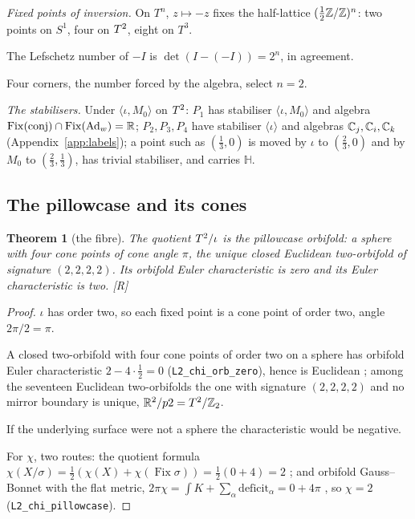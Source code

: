 \documentclass[11pt,a4paper]{article}
\theoremstyle{plain}
\newtheorem{theorem}{Theorem}[section]
\theoremstyle{definition}
\theoremstyle{remark}
\newcommand{\Hquat}{\mathbb{H}}
\newcommand{\Ad}{\operatorname{Ad}}
\newcommand{\Fix}{\operatorname{Fix}}
\newcommand{\rigR}{[\textup{R}]}
\begin{document}
\emph{Fixed points of inversion.} On $T^{n}$, $z\mapsto-z$ fixes the half-lattice $(\tfrac12\mathbb{Z}/\mathbb{Z})^{n}$: two points on $S^{1}$, four on $T^2$, eight on $T^{3}$.

The Lefschetz number of $-I$ is $\det(I-(-I))=2^{n}$, in agreement.

Four corners, the number forced by the algebra, select $n=2$.

\emph{The stabilisers.} Under $\langle\iota,M_{0}\rangle$ on $T^2$: $P_{1}$ has stabiliser $\langle\iota,M_{0}\rangle$ and algebra $\Fix(\text{conj})\cap\Fix(\Ad_{w})=\R$; $P_{2},P_{3},P_{4}$ have stabiliser $\langle\iota\rangle$ and algebras $\mathbb{C}_{j},\mathbb{C}_{i},\mathbb{C}_{k}$ (Appendix~\ref{app:labels}); a point such as $(\tfrac13,0)$ is moved by $\iota$ to $(\tfrac23,0)$ and by $M_{0}$ to $(\tfrac23,\tfrac13)$, has trivial stabiliser, and carries $\Hquat$.

\subsection{The pillowcase and its cones}

\begin{theorem}[the fibre]\label{thm:fibre}
The quotient $T^2/\iota$ is the pillowcase orbifold: a sphere with four cone points of cone angle $\pi$, the unique closed Euclidean two-orbifold of signature $(2,2,2,2)$. Its orbifold Euler characteristic is zero and its Euler characteristic is two. \rigR
\end{theorem}

\begin{proof}
$\iota$ has order two, so each fixed point is a cone point of order two, angle $2\pi/2=\pi$.

A closed two-orbifold with four cone points of order two on a sphere has orbifold Euler characteristic $2-4\cdot\tfrac12=0$ (\texttt{L2\_chi\_orb\_zero}), hence is Euclidean \cite{Thurston}; among the seventeen Euclidean two-orbifolds the one with signature $(2,2,2,2)$ and no mirror boundary is unique, $\mathbb{R}^{2}/p2=T^2/\mathbb{Z}_2$.

If the underlying surface were not a sphere the characteristic would be negative.

For $\chi$, two routes: the quotient formula $\chi(X/\sigma)=\tfrac12(\chi(X)+\chi(\Fix\sigma))=\tfrac12(0+4)=2$ \cite{Bredon}; and orbifold Gauss--Bonnet with the flat metric, $2\pi\chi=\int K+\sum_{\alpha}\mathrm{deficit}_{\alpha}=0+4\pi$ \cite{Satake}, so $\chi=2$ (\texttt{L2\_chi\_pillowcase}).
\end{proof}
\end{document}
